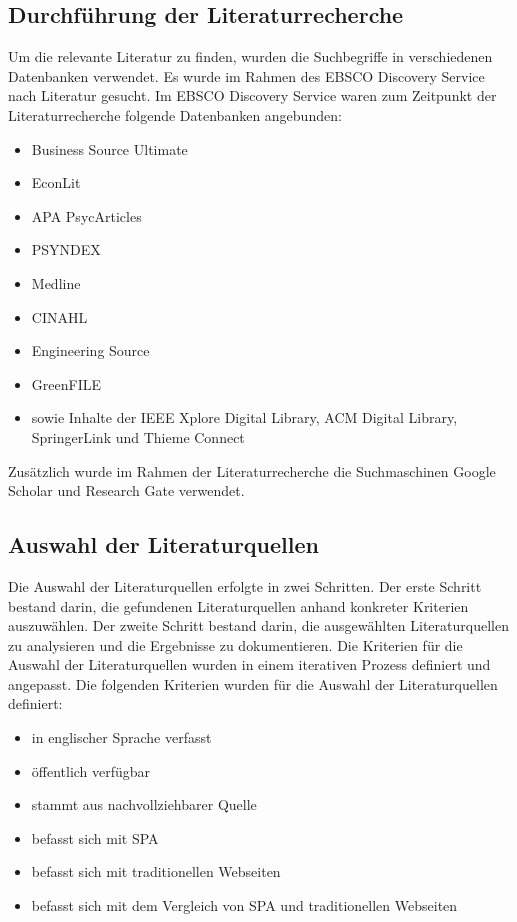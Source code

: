 \subsection{Durchführung der Literaturrecherche}
Um die relevante Literatur zu finden, wurden die Suchbegriffe in verschiedenen Datenbanken verwendet.
Es wurde im Rahmen des EBSCO Discovery Service nach Literatur gesucht.
Im EBSCO Discovery Service waren zum Zeitpunkt der Literaturrecherche folgende Datenbanken angebunden:
\begin{itemize}
    \item Business Source Ultimate
    \item EconLit
    \item APA PsycArticles
    \item PSYNDEX
    \item Medline
    \item CINAHL
    \item Engineering Source
    \item GreenFILE
    \item sowie Inhalte der IEEE Xplore Digital Library, ACM Digital Library, SpringerLink und Thieme Connect
\end{itemize}

Zusätzlich wurde im Rahmen der Literaturrecherche die Suchmaschinen Google Scholar und Research Gate verwendet.

\subsection{Auswahl der Literaturquellen}
Die Auswahl der Literaturquellen erfolgte in zwei Schritten.
Der erste Schritt bestand darin, die gefundenen Literaturquellen anhand konkreter Kriterien auszuwählen.
Der zweite Schritt bestand darin, die ausgewählten Literaturquellen zu analysieren und die Ergebnisse zu dokumentieren.
Die Kriterien für die Auswahl der Literaturquellen wurden in einem iterativen Prozess definiert und angepasst.
Die folgenden Kriterien wurden für die Auswahl der Literaturquellen definiert:
\begin{itemize}
    \item in englischer Sprache verfasst
    \item öffentlich verfügbar
    \item stammt aus nachvollziehbarer Quelle
    \item befasst sich mit \ac{SPA}
    \item befasst sich mit traditionellen Webseiten
    \item befasst sich mit dem Vergleich von \ac{SPA} und traditionellen Webseiten
\end{itemize}

